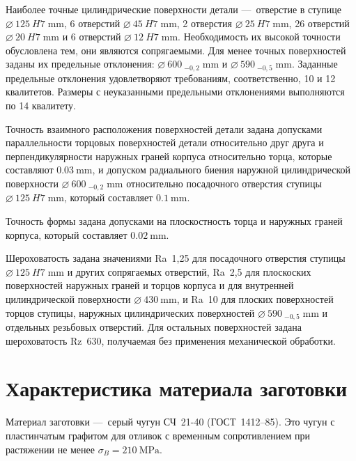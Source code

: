 \documentclass[14pt,russian,a4paper]{extreport}
\begin{document}
Наиболее точные цилиндрические поверхности детали --- отверстие в ступице $\SI{125}[\diameter]{H7 \; \milli\meter}$, 6 отверстий $\SI{45}[\diameter]{H7 \; \milli\meter}$, 2 отверстия $\SI{25}[\diameter]{H7 \; \milli\meter}$, 26 отверстий $\SI{20}[\diameter]{H7 \; \milli\meter}$ и 6 отверстий $\SI{12}[\diameter]{H7 \; \milli\meter}$. Необходимость их высокой точности обусловлена тем, они являются сопрягаемыми. Для менее точных поверхностей заданы их предельные отклонения: $\SI{600}[\diameter]{_{-0,2} \; \milli\meter}$ и $\SI{590}[\diameter]{_{-0,5} \; \milli\meter}$. Заданные предельные отклонения удовлетворяют требованиям, соответственно, 10 и 12 квалитетов. Размеры с неуказанными предельными отклонениями выполняются по 14 квалитету. \par

Точность взаимного расположения поверхностей детали задана допусками параллельности торцовых поверхностей детали относительно друг друга и перпендикулярности наружных граней корпуса относительно торца, которые составляют $\SI{0,03}{\milli\meter}$, и допуском радиального биения наружной цилиндрической поверхности $\SI{600}[\diameter]{_{-0,2} \; \milli\meter}$ относительно посадочного отверстия ступицы $\SI{125}[\diameter]{H7 \; \milli\meter}$, который составляет $\SI{0,1}{\milli\meter}$. \par

Точность формы задана допусками на плоскостность торца и наружных граней корпуса, который составляет $\SI{0,02}{\milli\meter}$. \par

Шероховатость задана значениями Ra~1,25 для посадочного отверстия ступицы $\SI{125}[\diameter]{H7 \; \milli\meter}$ и других сопрягаемых отверстий, Ra~2,5 для плоскоских поверхностей наружных граней и торцов корпуса и для внутренней цилиндрической поверхности $\SI{430}[\diameter]{\milli\meter}$, и Ra~10 для плоских поверхностей торцов ступицы, наружных цилиндрических поверхностей $\SI{590}[\diameter]{_{-0,5} \; \milli\meter}$ и отдельных резьбовых отверстий. Для остальных поверхностей задана шероховатость Rz~630, получаемая без применения механической обработки.


\section{Характеристика материала заготовки}

Материал заготовки --- серый чугун СЧ~21-40 (ГОСТ~1412--85). Это чугун с пластинчатым графитом для отливок с временным сопротивлением при растяжении не менее $\sigma_B = \SI{210}{\mega\pascal}$. \par
\end{document}

